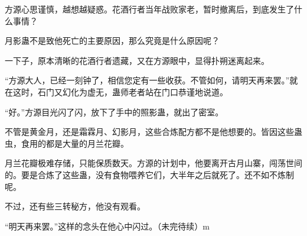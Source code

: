 \begin{this_body}
方源心思谨慎，越想越疑惑。花酒行者当年战败家老，暂时撤离后，到底发生了什么事情？

月影蛊不是致他死亡的主要原因，那么究竟是什么原因呢？

一下子，原本清晰的花酒行者遗藏，又在方源眼中，显得扑朔迷离起来。

“方源大人，已经一刻钟了，相信您定有一些收获。不管如何，请明天再来罢。”就在这时，石门又幻化为虚无，蛊师老者站在门口恭谨地说道。

“好。”方源目光闪了闪，放下了手中的照影蛊，就出了密室。

不管是黄金月，还是霜霖月、幻影月，这些合炼配方都不是他想要的。皆因这些蛊虫，食用的都是大量的月兰花瓣。

月兰花瓣极难存储，只能保质数天。方源的计划中，他要离开古月山寨，闯荡世间的。要是合炼了这些蛊，没有食物喂养它们，大半年之后就死了。还不如不炼制呢。

不过，还有些三转秘方，他没有观看。

“明天再来罢。”这样的念头在他心中闪过。（未完待续）m

\end{this_body}

